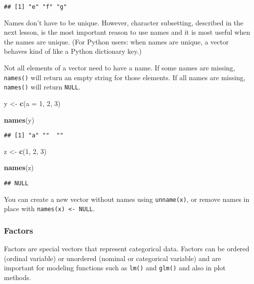 \documentclass[
]{book}
\newenvironment{Shaded}{\begin{snugshade}}{\end{snugshade}}
\newcommand{\DataTypeTok}[1]{\textcolor[rgb]{0.13,0.29,0.53}{#1}}
\newcommand{\DecValTok}[1]{\textcolor[rgb]{0.00,0.00,0.81}{#1}}
\newcommand{\KeywordTok}[1]{\textcolor[rgb]{0.13,0.29,0.53}{\textbf{#1}}}
\newcommand{\NormalTok}[1]{#1}
\newcommand{\StringTok}[1]{\textcolor[rgb]{0.31,0.60,0.02}{#1}}
\begin{document}
\begin{verbatim}
## [1] "e" "f" "g"
\end{verbatim}

Names don't have to be unique. However, character subsetting, described in the next lesson, is the most important reason to use names and it is most useful when the names are unique. (For Python users: when names are unique, a vector behaves kind of like a Python dictionary key.)

Not all elements of a vector need to have a name. If some names are missing, \texttt{names()} will return an empty string for those elements. If all names are missing, \texttt{names()} will return \texttt{NULL}.

\begin{Shaded}
\begin{Highlighting}[]
\NormalTok{y \textless{}{-}}\StringTok{ }\KeywordTok{c}\NormalTok{(}\DataTypeTok{a =} \DecValTok{1}\NormalTok{, }\DecValTok{2}\NormalTok{, }\DecValTok{3}\NormalTok{)}

\KeywordTok{names}\NormalTok{(y)}
\end{Highlighting}
\end{Shaded}

\begin{verbatim}
## [1] "a" ""  ""
\end{verbatim}

\begin{Shaded}
\begin{Highlighting}[]
\NormalTok{z \textless{}{-}}\StringTok{ }\KeywordTok{c}\NormalTok{(}\DecValTok{1}\NormalTok{, }\DecValTok{2}\NormalTok{, }\DecValTok{3}\NormalTok{)}

\KeywordTok{names}\NormalTok{(z)}
\end{Highlighting}
\end{Shaded}

\begin{verbatim}
## NULL
\end{verbatim}

You can create a new vector without names using \texttt{unname(x)}, or remove names in place with \texttt{names(x)\ \textless{}-\ NULL}.

\hypertarget{factors}{%
\subsubsection{Factors}\label{factors}}

Factors are special vectors that represent categorical data. Factors can be ordered (ordinal variable) or unordered (nominal or categorical variable) and are important for modeling functions such as \texttt{lm()} and \texttt{glm()} and also in plot methods.
\end{document}
